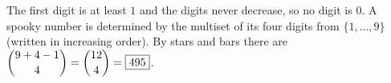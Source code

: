 The first digit is at least $1$ and the digits never decrease, so no digit is $0$. A spooky number is determined by the multiset of its four digits from $\{1,\dots,9\}$ (written in increasing order). By stars and bars there are $\dbinom{9+4-1}{4}=\dbinom{12}{4}=\boxed{495}$.
